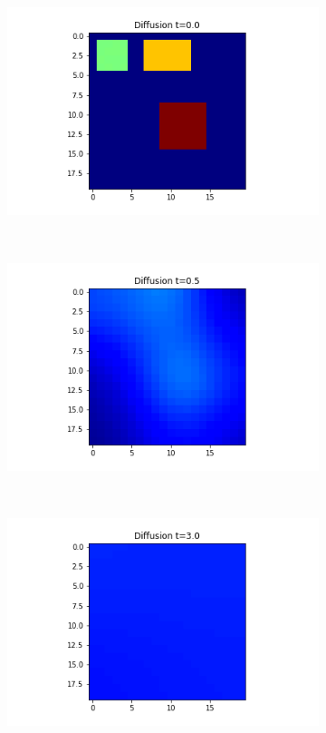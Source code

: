 \documentclass[10pt,a4paper]{article}
\begin{document}
\begin{figure}[!h]
	\centering
	\begin{subfigure}[b]{0.25\textwidth}
		\includegraphics[width=\textwidth]{images/grid-t0-x02.png}
	\end{subfigure}~
	\begin{subfigure}[b]{0.25\textwidth}
		\includegraphics[width= \textwidth]{images/grid-t05-x02.png}
	\end{subfigure}~
	\begin{subfigure}[b]{0.25\textwidth}
		\includegraphics[width= \textwidth]{images/grid-t3-x02.png}

\end{subfigure}
\end{figure}
\end{document}
